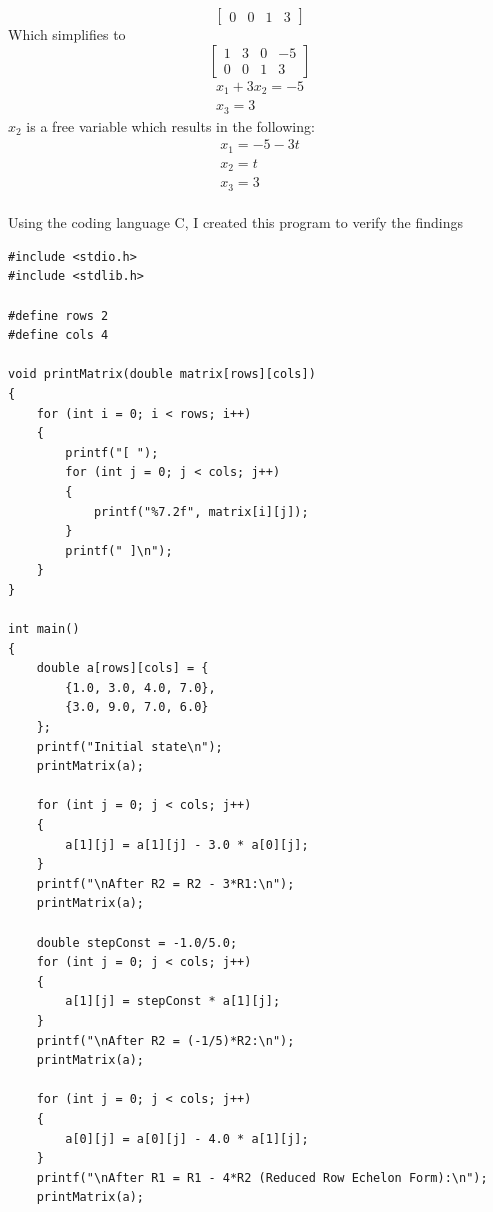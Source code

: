 \documentclass[12pt,letterpaper, onecolumn]{exam}
\begin{document}
\begin{questions}
\begin{solution}
$$\begin{bmatrix}
                0 & 0 & 1 & 3
            \end{bmatrix}
            $$
            Which simplifies to
            $$
            \begin{bmatrix}
                1 & 3 & 0 & -5\\
                0 & 0 & 1 & 3
            \end{bmatrix}
            $$
            $$
            \begin{matrix}
                x_1 + 3x_2 = -5\\
                x_3 = 3
            \end{matrix}
            $$
            $x_2$ is a free variable which results in the following:
            $$
            \begin{matrix}
                x_1 = -5 -3t\\
                x_2 = t\\
                x_3 = 3
            \end{matrix}
            $$\\
            Using the coding language C, I created this program to verify the findings
            \begin{lstlisting}
#include <stdio.h>
#include <stdlib.h>

#define rows 2
#define cols 4

void printMatrix(double matrix[rows][cols])
{
    for (int i = 0; i < rows; i++)
    {
        printf("[ ");
        for (int j = 0; j < cols; j++)
        {
            printf("%7.2f", matrix[i][j]);
        }
        printf(" ]\n");
    }
}

int main() 
{
    double a[rows][cols] = {
        {1.0, 3.0, 4.0, 7.0},
        {3.0, 9.0, 7.0, 6.0}
    };
    printf("Initial state\n");
    printMatrix(a);

    for (int j = 0; j < cols; j++)
    {
        a[1][j] = a[1][j] - 3.0 * a[0][j];
    }
    printf("\nAfter R2 = R2 - 3*R1:\n");
    printMatrix(a);

    double stepConst = -1.0/5.0;
    for (int j = 0; j < cols; j++)
    {
        a[1][j] = stepConst * a[1][j];
    }
    printf("\nAfter R2 = (-1/5)*R2:\n");
    printMatrix(a);

    for (int j = 0; j < cols; j++)
    {
        a[0][j] = a[0][j] - 4.0 * a[1][j];
    }
    printf("\nAfter R1 = R1 - 4*R2 (Reduced Row Echelon Form):\n");
    printMatrix(a);


\end{lstlisting}
\end{solution}
\end{questions}
\end{document}
